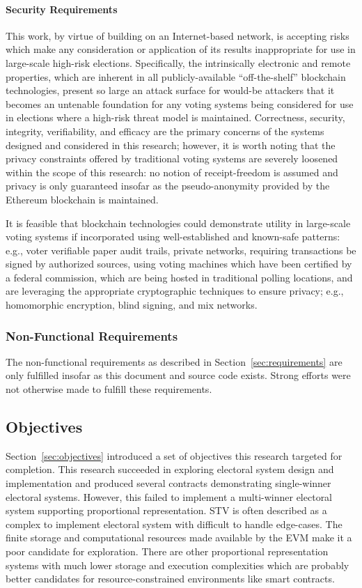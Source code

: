 \paragraph{Security Requirements}
This work, by virtue of building on an Internet-based network, is accepting
risks which make any consideration or application of its results inappropriate
for use in large-scale high-risk elections. Specifically, the intrinsically
electronic and remote properties, which are inherent in all publicly-available
``off-the-shelf'' blockchain technologies, present so large an attack surface
for would-be attackers that it becomes an untenable foundation for any voting
systems being considered for use in elections where a high-risk threat model is
maintained. Correctness, security, integrity, verifiability, and efficacy are
the primary concerns of the systems designed and considered in this research;
however, it is worth noting that the privacy constraints offered by traditional
voting systems are severely loosened within the scope of this research: no
notion of receipt-freedom is assumed and privacy is only guaranteed insofar as
the pseudo-anonymity provided by the Ethereum blockchain is maintained.

It is feasible that blockchain technologies could demonstrate utility in
large-scale voting systems if incorporated using well-established and known-safe
patterns: e.g., voter verifiable paper audit trails, private networks, requiring
transactions be signed by authorized sources, using voting machines which have
been certified by a federal commission, which are being hosted in traditional
polling locations, and are leveraging the appropriate cryptographic techniques
to ensure privacy; e.g., homomorphic encryption, blind signing, and mix
networks.

\subsubsection{Non-Functional Requirements}
The non-functional requirements as described in Section~\ref{sec:requirements}
are only fulfilled insofar as this document and source code exists. Strong
efforts were not otherwise made to fulfill these requirements.

\subsection{Objectives}
Section~\ref{sec:objectives} introduced a set of objectives this research
targeted for completion. This research succeeded in exploring electoral system
design and implementation and produced several contracts demonstrating
single-winner electoral systems. However, this failed to implement a
multi-winner electoral system supporting proportional representation. STV is
often described as a complex to implement electoral system with difficult to
handle edge-cases. The finite storage and computational resources made available
by the EVM make it a poor candidate for exploration. There are other
proportional representation systems with much lower storage and execution
complexities which are probably better candidates for resource-constrained
environments like smart contracts.

